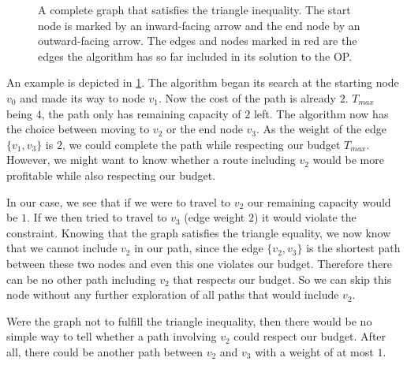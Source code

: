 \begin{figure}
  \centering
  \caption{A complete graph that satisfies the triangle inequality. 
  The start node is marked by an inward-facing arrow and the end node by an outward-facing arrow. 
  The edges and nodes marked in red are the edges the algorithm has so far included in its solution to the OP.}
  \label{fig:02:example_triangle}
\end{figure}

An example is depicted in \cref{fig:02:example_triangle}. The algorithm began its search at the starting node $v_0$ and made its way to node $v_1$.
Now the cost of the path is already $2$. $T_{max}$ being $4$, the path only has remaining capacity of $2$ left.
The algorithm now has the choice between moving to $v_2$ or the end node $v_3$. As the weight of the edge $\{v_1, v_3\}$ is $2$, we could complete the path while respecting our budget $T_{max}$.
However, we might want to know whether a route including $v_2$ would be more profitable while also respecting our budget.

In our case, we see that if we were to travel to $v_2$ our remaining capacity would be $1$.
If we then tried to travel to $v_3$ (edge weight $2$) it would violate the constraint.
Knowing that the graph satisfies the triangle equality, we now know that we cannot include $v_2$ in our path, since the edge $\{v_2, v_3\}$ is the shortest path between these two nodes and even this one violates our budget.
Therefore there can be no other path including $v_2$ that respects our budget. 
So we can skip this node without any further exploration of all paths that would include $v_2$. 

Were the graph not to fulfill the triangle inequality, then there would be no simple way to tell whether a path involving $v_2$ could respect our budget.
After all, there could be another path between $v_2$ and $v_3$ with a weight of at most $1$.

